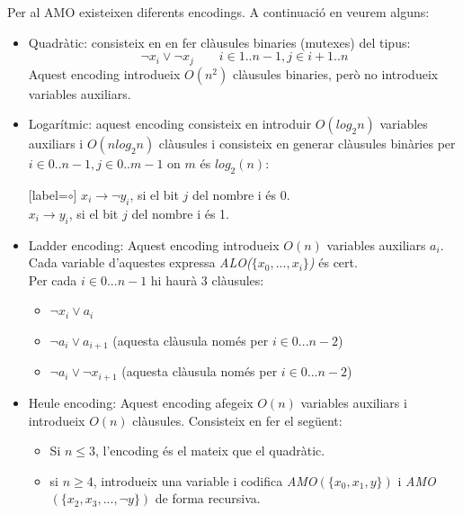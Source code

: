 \documentclass[11pt,a4paper,twoside]{report}
\begin{document}
  Per al AMO existeixen diferents encodings. A continuació en veurem alguns:
  \begin{itemize}
    \item Quadràtic: consisteix en en fer clàusules binaries (mutexes) del tipus: \[ \neg x_i \vee \neg x_j \qquad i \in 1..n-1, j \in i+1..n\] Aquest encoding introdueix $O(n^2)$ clàusules binaries, però no introdueix variables auxiliars.
    \item Logarítmic: aquest encoding consisteix en introduir $O(log_2 n)$ variables auxiliars i $O(n log_2 n)$ clàusules i consisteix en generar clàusules binàries per $i \in 0..n-1, j \in 0..m-1$ on $m$ és $log_2(n)$:\\
          \begin{center}[label=$\circ$]
            $x_i \rightarrow \neg y_i$, si el bit $j$ del nombre i és 0. \\
            $x_i \rightarrow y_i$, si el bit $j$ del nombre i és 1.
          \end{center}
    \item Ladder encoding: Aquest encoding introdueix $O(n)$ variables auxiliars $a_i$. Cada variable d'aquestes expressa \textit{ALO($\{x_0, ... , x_i\}$)} és cert. \\
          Per cada $i \in 0...n-1$ hi haurà 3 clàusules:
          \begin{itemize}[label=$\circ$]
            \item $\neg x_i \vee a_i$
            \item $\neg a_i \vee a_{i+1}$  (aquesta clàusula només per $i \in 0...n-2$)
            \item $\neg a_i \vee \neg x_{i+1}$ (aquesta clàusula només per  $i \in 0...n-2$)
          \end{itemize}
    
    \item Heule encoding: Aquest encoding afegeix $O(n)$ variables auxiliars i introdueix $O(n)$ clàusules. Consisteix en fer el següent:\\ 
    \begin{itemize}
      \item Si $n \leq 3$, l'encoding és el mateix que el quadràtic.
      \item si $n \geq 4$, introdueix una variable i codifica \textit{AMO$(\{x_0, x_1, y\})$} i \textit{AMO$(\{x_2, x_3, ...  ,\neg y\})$} de forma recursiva.
    \end{itemize} 
          
    
  \end{itemize}
\end{document}
